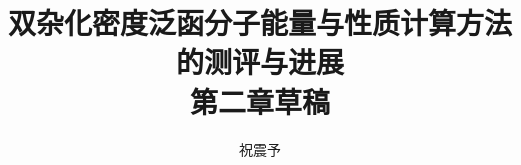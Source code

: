 



\title{\textbf{双杂化密度泛函分子能量与性质计算方法的测评与进展\\第二章草稿}}
\author{祝震予}
\maketitle
\vspace{-10pt}

\tableofcontents


\setcounter{section}{1}



\newpage






